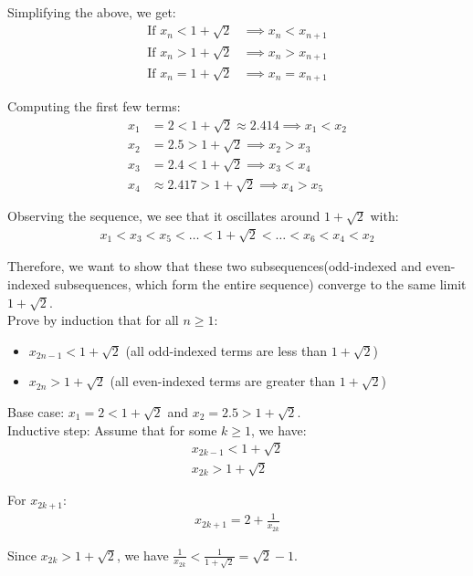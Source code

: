\documentclass{article}
\begin{document}
Simplifying the above, we get:
\begin{align*}
\text{If } x_n < 1 + \sqrt{2} &\implies x_n < x_{n+1}\\
\text{If } x_n > 1 + \sqrt{2} &\implies x_n > x_{n+1}\\
\text{If } x_n = 1 + \sqrt{2} &\implies x_n = x_{n+1}
\end{align*}

Computing the first few terms:
\begin{align*}
x_1 &= 2 < 1 + \sqrt{2} \approx 2.414 \implies x_1 < x_2\\
x_2 &= 2.5 > 1 + \sqrt{2} \implies x_2 > x_3\\
x_3 &= 2.4 < 1 + \sqrt{2} \implies x_3 < x_4\\
x_4 &\approx 2.417 > 1 + \sqrt{2} \implies x_4 > x_5
\end{align*}

Observing the sequence, we see that it oscillates around $1 + \sqrt{2}$ with:
\begin{align*}
x_1 < x_3 < x_5 < \ldots < 1 + \sqrt{2} < \ldots < x_6 < x_4 < x_2
\end{align*}

Therefore, we want to show that these two subsequences(odd-indexed and even-indexed subsequences, which form the entire sequence) converge to the same limit $1 + \sqrt{2}$. \\

Prove by induction that for all $n \geq 1$:
\begin{itemize}
    \item $x_{2n-1} < 1 + \sqrt{2}$ (all odd-indexed terms are less than $1 + \sqrt{2}$)
    \item $x_{2n} > 1 + \sqrt{2}$ (all even-indexed terms are greater than $1 + \sqrt{2}$)
\end{itemize}

Base case: $x_1 = 2 < 1 + \sqrt{2}$ and $x_2 = 2.5 > 1 + \sqrt{2}$. \\

Inductive step: Assume that for some $k \geq 1$, we have:
\begin{align*}
x_{2k-1} < 1 + \sqrt{2} \\
x_{2k} > 1 + \sqrt{2}
\end{align*}

For $x_{2k+1}$:
\begin{align*}
x_{2k+1} = 2 + \frac{1}{x_{2k}}
\end{align*}

Since $x_{2k} > 1 + \sqrt{2}$, we have $\frac{1}{x_{2k}} < \frac{1}{1 + \sqrt{2}} = \sqrt{2} - 1$. \\
\end{document}
